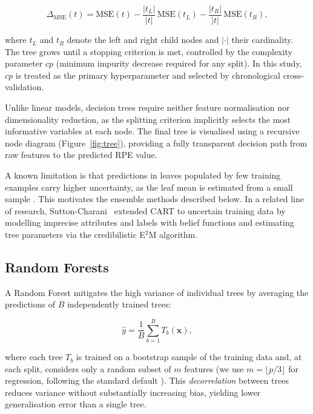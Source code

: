 \documentclass[10pt, twocolumn]{article}
\begin{document}
\begin{equation}
  \Delta_{\text{MSE}}(t) = \text{MSE}(t)
    - \frac{|t_L|}{|t|}\,\text{MSE}(t_L)
    - \frac{|t_R|}{|t|}\,\text{MSE}(t_R),
  \label{eq:mse_split}
\end{equation}

where $t_L$ and $t_R$ denote the left and right child nodes and
$|\cdot|$ their cardinality. The tree grows until a stopping criterion
is met, controlled by the complexity parameter $cp$ (minimum impurity
decrease required for any split). In this study, $cp$ is treated as
the primary hyperparameter and selected by chronological cross-validation.

Unlike linear models, decision trees require neither feature normalisation
nor dimensionality reduction, as the splitting criterion implicitly selects
the most informative variables at each node. The final tree is visualised
using a recursive node diagram (Figure~\ref{fig:tree}), providing a fully
transparent decision path from raw features to the predicted RPE value.

A known limitation is that predictions in leaves populated by few training
examples carry higher uncertainty, as the leaf mean is estimated from a
small sample \citep{breiman1984}. This motivates the ensemble methods
described below. In a related line of research, Sutton-Charani~\citep{suttoncharani2014}
extended CART to uncertain training data by modelling imprecise attributes
and labels with belief functions and estimating tree parameters via the
credibilistic E$^2$M algorithm.

\subsection{Random Forests}
\label{subsec:rf}

A Random Forest \citep{breiman2001} mitigates the high variance of individual
trees by averaging the predictions of $B$ independently trained trees:

\begin{equation}
  \hat{y} = \frac{1}{B} \sum_{b=1}^{B} T_b(\mathbf{x}),
  \label{eq:rf_avg}
\end{equation}

where each tree $T_b$ is trained on a bootstrap sample of the training data
and, at each split, considers only a random subset of $m$ features
(we use $m = \lfloor p/3 \rfloor$ for regression, following the standard
default \citep{hastie2009}). This \emph{decorrelation} between trees reduces
variance without substantially increasing bias, yielding lower generalisation
error than a single tree.
\end{document}
